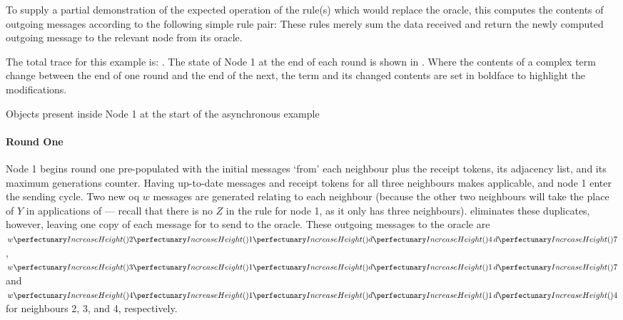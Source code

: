 To supply a partial demonstration of the expected operation of the rule(s) which would replace the oracle, this  computes the contents of outgoing messages according to the following simple rule pair: 
These rules merely sum the data received and return the newly computed outgoing message to the relevant node from its oracle.

\setcounter{traces}{-1}

The total trace for this example is:  \tarr{}  \tarr{}  \tarr{}  \tarr{}  \tarr{} .  The state of Node 1 at the end of each round is shown in .  Where the contents of a complex term change between the end of one round and the end of the next, the term and its changed contents are set in boldface to highlight the modifications.

\begin{cpobjectsfloat}
\begin{cpobjects}
\end{cpobjects}
\caption{\label{objs:nmp:ex0}Objects present inside Node 1 at the start of the asynchronous  example}
\end{cpobjectsfloat}

\paragraph{Round One}
Node 1 begins round one pre-populated with the initial messages `from' each neighbour plus the receipt tokens, its adjacency list, and its maximum generations counter.  Having up-to-date messages and receipt tokens for all three neighbours makes  applicable, and node 1 enter the sending cycle.  Two new \gls{oq} \(w\) messages are generated relating to each neighbour (because the other two neighbours will take the place of \(Y\) in applications of  --- recall that there is no \(Z\) in the rule for node 1, as it only has three neighbours).   eliminates these duplicates, however, leaving one copy of each message for  to send to the oracle.  These outgoing messages to the oracle are \(\cpvw{2}{1}{\cpfunc{d}{4} \, \cpfunc{d}{7}}\), \(\cpvw{3}{1}{\cpfunc{d}{1} \, \cpfunc{d}{7}}\) and \(\cpvw{4}{1}{\cpfunc{d}{1} \, \cpfunc{d}{4}}\) for neighbours 2, 3, and 4, respectively.

